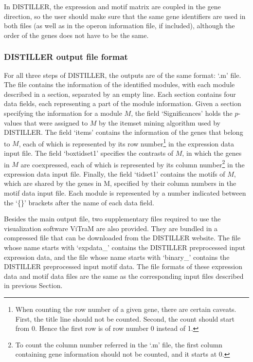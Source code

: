 In DISTILLER, the expression and motif matrix are coupled in the gene 
direction, so the user should make sure that the same gene identifiers are used 
in both files (as well as in the operon information file, if included), 
although the order of the genes does not have to be the same.

\subsubsection{DISTILLER output file format}\label{sec:distiller-outfile-format}
For all three steps of DISTILLER, the outputs are 
of the same format: `.m' file.  The file contains the information of the 
identified modules, with each module described in a section, separated by an 
empty line.  Each section contains four data fields, each representing a part 
of the module information.  Given a section specifying the information for a 
module $M$, the field `Significances' holds the $p$-values that were assigned 
to $M$ by the itemset mining algorithm \cite{Zaki} used by DISTILLER.  The 
field `items' contains the information of the genes that belong to $M$, each of 
which is represented by its row number\footnote{When counting the row number 
of a given gene, there are certain caveats. First, the title line should not be 
counted. Second, the count should start from 0. Hence the first row is of row 
number 0 instead of 1.} in the expression data input file. The field 
`boxtidset1' specifies the contrasts of $M$, in which the genes in $M$ are 
coexpressed, each of which is represented by its column number\footnote{To 
count the column number referred in the `.m' file, the first column containing 
gene information should not be counted, and it starts at 0.}
in the expression data input file. Finally, the field `tidset1' 
contains the motifs of $M$, which are shared by the genes in M, specified by 
their column numbers in the motif data input file. Each module is represented 
by a number indicated between the `\{\}' brackets after the name of each data 
field.

Besides the main output file, two supplementary files required to use the 
visualization software ViTraM are also provided. They are bundled in a 
compressed file that can be downloaded from the DISTILLER website. The file 
whose name starts with `expdata\_' contains the DISTILLER preprocessed input 
expression data, and the file whose name starts with `binary\_' contains the 
DISTILLER preprocessed input motif data. The file formats of these expression 
data and motif data files are the same as the corresponding input files 
described in previous Section.

